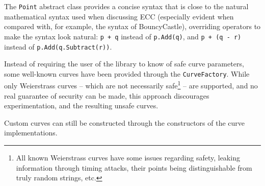 The \verb+Point+ abstract class provides a concise syntax that is close to the natural mathematical syntax used
when discussing ECC (especially evident when compared with, for example, the syntax of BouncyCastle), overriding
operators to make the syntax look natural: \verb|p + q| instead of \verb|p.Add(q)|, and \verb|p + (q - r)| instead of
\verb|p.Add(q.Subtract(r))|.

Instead of requiring the user of the library to know of safe curve parameters, some well-known curves have been
provided through the \verb|CurveFactory|. While only Weierstrass curves -- which are not necessarily
safe\footnote{All known Weierstrass curves have some issues regarding safety, leaking information through timing
attacks, their points being distinguishable from truly random strings, etc.\cite{safecurves}} -- are supported, and no real
guarantee of security can be made, this approach discourages experimentation, and the resulting unsafe curves.

Custom curves can still be constructed through the constructors of the curve implementations.

\begin{figure}
	
\end{figure}